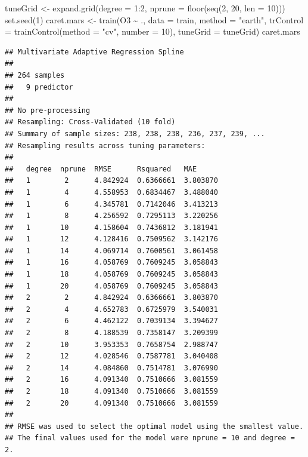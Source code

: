 \documentclass[
]{book}
\newenvironment{Shaded}{\begin{snugshade}}{\end{snugshade}}
\newcommand{\AttributeTok}[1]{\textcolor[rgb]{0.77,0.63,0.00}{#1}}
\newcommand{\DecValTok}[1]{\textcolor[rgb]{0.00,0.00,0.81}{#1}}
\newcommand{\FunctionTok}[1]{\textcolor[rgb]{0.00,0.00,0.00}{#1}}
\newcommand{\NormalTok}[1]{#1}
\newcommand{\OtherTok}[1]{\textcolor[rgb]{0.56,0.35,0.01}{#1}}
\newcommand{\SpecialCharTok}[1]{\textcolor[rgb]{0.00,0.00,0.00}{#1}}
\newcommand{\StringTok}[1]{\textcolor[rgb]{0.31,0.60,0.02}{#1}}
\theoremstyle{break}
\theoremstyle{definition}
\theoremstyle{definition}
\theoremstyle{definition}
\theoremstyle{definition}
\theoremstyle{remark}
\begin{document}
\begin{Shaded}
\begin{Highlighting}[]
\NormalTok{tuneGrid }\OtherTok{\textless{}{-}} \FunctionTok{expand.grid}\NormalTok{(}\AttributeTok{degree =} \DecValTok{1}\SpecialCharTok{:}\DecValTok{2}\NormalTok{, }
                       \AttributeTok{nprune =} \FunctionTok{floor}\NormalTok{(}\FunctionTok{seq}\NormalTok{(}\DecValTok{2}\NormalTok{, }\DecValTok{20}\NormalTok{, }\AttributeTok{len =} \DecValTok{10}\NormalTok{)))}
\FunctionTok{set.seed}\NormalTok{(}\DecValTok{1}\NormalTok{)}
\NormalTok{caret.mars }\OtherTok{\textless{}{-}} \FunctionTok{train}\NormalTok{(O3 }\SpecialCharTok{\textasciitilde{}}\NormalTok{ ., }\AttributeTok{data =}\NormalTok{ train, }\AttributeTok{method =} \StringTok{"earth"}\NormalTok{,}
    \AttributeTok{trControl =} \FunctionTok{trainControl}\NormalTok{(}\AttributeTok{method =} \StringTok{"cv"}\NormalTok{, }\AttributeTok{number =} \DecValTok{10}\NormalTok{),}
    \AttributeTok{tuneGrid =}\NormalTok{ tuneGrid)}
\NormalTok{caret.mars}
\end{Highlighting}
\end{Shaded}

\begin{verbatim}
## Multivariate Adaptive Regression Spline 
## 
## 264 samples
##   9 predictor
## 
## No pre-processing
## Resampling: Cross-Validated (10 fold) 
## Summary of sample sizes: 238, 238, 238, 236, 237, 239, ... 
## Resampling results across tuning parameters:
## 
##   degree  nprune  RMSE      Rsquared   MAE     
##   1        2      4.842924  0.6366661  3.803870
##   1        4      4.558953  0.6834467  3.488040
##   1        6      4.345781  0.7142046  3.413213
##   1        8      4.256592  0.7295113  3.220256
##   1       10      4.158604  0.7436812  3.181941
##   1       12      4.128416  0.7509562  3.142176
##   1       14      4.069714  0.7600561  3.061458
##   1       16      4.058769  0.7609245  3.058843
##   1       18      4.058769  0.7609245  3.058843
##   1       20      4.058769  0.7609245  3.058843
##   2        2      4.842924  0.6366661  3.803870
##   2        4      4.652783  0.6725979  3.540031
##   2        6      4.462122  0.7039134  3.394627
##   2        8      4.188539  0.7358147  3.209399
##   2       10      3.953353  0.7658754  2.988747
##   2       12      4.028546  0.7587781  3.040408
##   2       14      4.084860  0.7514781  3.076990
##   2       16      4.091340  0.7510666  3.081559
##   2       18      4.091340  0.7510666  3.081559
##   2       20      4.091340  0.7510666  3.081559
## 
## RMSE was used to select the optimal model using the smallest value.
## The final values used for the model were nprune = 10 and degree = 2.
\end{verbatim}
\end{document}
